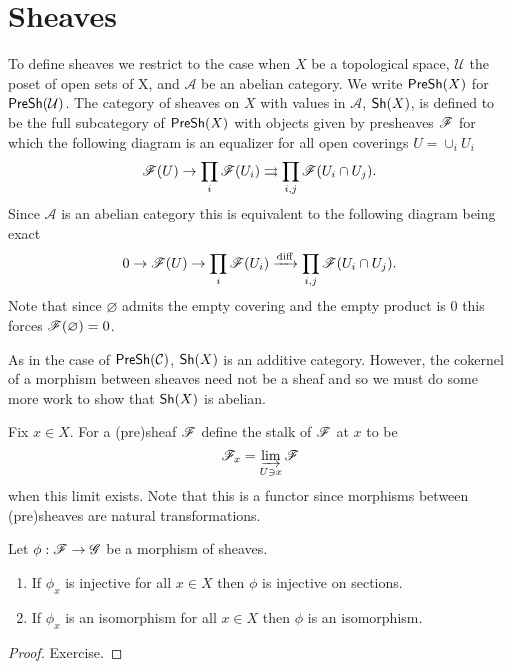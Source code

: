 \documentclass{memoir}
\begin{document}
\section{Sheaves}
To define sheaves we restrict to the case when $X$ be a topological space, $\mathcal U$ the poset of open sets of X, and $\mathcal A$ be an abelian category.
We write ${\normalfont\mathsf{PreSh}}(X)$ for ${\normalfont\mathsf{PreSh}}(\mathcal U)$.
The category of sheaves on $X$ with values in $\mathcal A$, ${\normalfont\mathsf{Sh}}(X)$, is defined to be the full subcategory of ${\normalfont\mathsf{PreSh}}(X)$ with objects given by presheaves $\mathscr{F}$ for which the following diagram is an equalizer for all open coverings $U = \cup_i U_i$
\begin{equation}
\mathscr{F}(U)\rightarrow \prod_i \mathscr{F}(U_i) \rightrightarrows \prod_{i,j} \mathscr{F}(U_i\cap U_j).
\end{equation}
Since $\mathcal A$ is an abelian category this is equivalent to the following diagram being exact
\begin{equation}
0\rightarrow \mathscr{F}(U)\rightarrow \prod_i \mathscr{F}(U_i) \xrightarrow[]{\text{diff}} \prod_{i,j} \mathscr{F}(U_i\cap U_j).
\end{equation}
Note that since $\varnothing$ admits the empty covering and the empty product is $0$ this forces $\mathscr{F}(\varnothing) = 0$.

As in the case of ${\normalfont\mathsf{PreSh}}(\mathcal C)$, ${\normalfont\mathsf{Sh}}(X)$ is an additive category.
However, the cokernel of a morphism between sheaves need not be a sheaf and so we must do some more work to show that ${\normalfont\mathsf{Sh}}(X)$ is abelian.

Fix $x\in X$.
For a (pre)sheaf $\mathscr{F}$ define the stalk of $\mathscr{F}$ at $x$ to be 
\begin{equation}
    \mathscr{F}_x = \varinjlim_{U\ni x}\mathscr{F}
\end{equation}
when this limit exists. Note that this is a functor since morphisms between (pre)sheaves are natural transformations.
\begin{thm}
    Let $\phi:\mathscr{F}\to \mathscr{G}$ be a morphism of sheaves.
    \begin{enumerate}
        \item If $\phi_x$ is injective for all $x\in X$ then $\phi$ is injective on sections.
        \item If $\phi_x$ is an isomorphism for all $x\in X$ then $\phi$ is an isomorphism.
    \end{enumerate}
\end{thm}
\begin{proof}
Exercise.
\end{proof}
\end{document}
